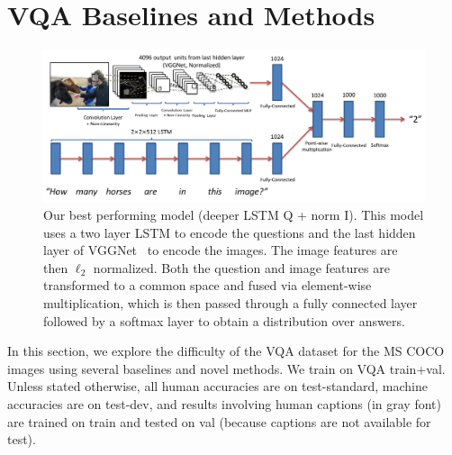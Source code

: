 \section{VQA Baselines and Methods}
\begin{figure}[h]
\includegraphics[width=1\linewidth]{figures/best_model_compressed.pdf}
\centering
\caption{Our best performing model (deeper LSTM Q + norm I). This model uses a two layer LSTM to encode the questions and the last hidden layer of VGGNet~\cite{Simonyan14c} to encode the images. The image features are then $\ell_2$ normalized. Both the question and image features are transformed to a common space and fused via element-wise multiplication, which is then passed through a fully connected layer followed by a softmax layer to obtain a distribution over answers.}
\label{fig:best_model}
\end{figure}
In this section, we explore the difficulty of the VQA dataset for the MS COCO images using several baselines 
and novel methods. We train on VQA train+val. Unless stated otherwise, all human accuracies are on test-standard, machine accuracies are on test-dev, and results involving human captions (in gray font) are trained on train and tested on val (because captions are not available for test). 

